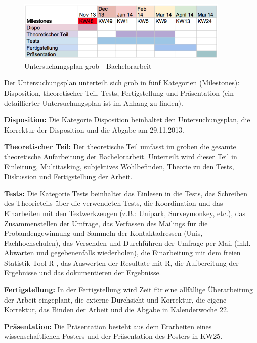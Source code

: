 \begin{figure}[H]
	\centering
	    \includegraphics[width=0.9\textwidth]
		{images/Untersuchungsplan_Grob.png}
	\caption{Untersuchungsplan grob - Bachelorarbeit}
	\label{fig.UntersuchungsplanGrob}
\end{figure}
Der Untersuchungsplan unterteilt sich grob in fünf Kategorien (Milestones): Disposition, theoretischer Teil, Tests, Fertigstellung und Präsentation (ein detaillierter Untersuchungsplan ist im Anhang zu finden).\par
\textbf{Disposition:} Die Kategorie Disposition beinhaltet den Untersuchungsplan, die Korrektur der Disposition und die Abgabe am 29.11.2013.\par
\textbf{Theoretischer Teil:} Der theoretische Teil umfasst im groben die gesamte theoretische Aufarbeitung der Bachelorarbeit. Unterteilt wird dieser Teil in Einleitung, Multitasking, subjektives Wohlbefinden, Theorie zu den Tests, Diskussion und Fertigstellung der Arbeit. \par
\textbf{Tests:} Die Kategorie Tests beinhaltet das Einlesen in die Tests, das Schreiben des Theorieteils über die verwendeten Tests, die Koordination und das Einarbeiten mit den Testwerkzeugen (z.B.: Unipark, Surveymonkey, etc.), das Zusammenstellen der Umfrage, das Verfassen des Mailings für die Probandengewinnung und Sammeln der Kontaktadressen (Unis, Fachhochschulen), das Versenden und Durchführen der Umfrage per Mail (inkl. Abwarten und gegebenenfalls wiederholen), die Einarbeitung mit dem freien Statistik-Tool R \cite{Luhmann2013}, das Auswerten der Resultate mit R, die Aufbereitung der Ergebnisse und das dokumentieren der Ergebnisse.\par
\textbf{Fertigstellung:} In der Fertigstellung wird Zeit für eine allfällige Überarbeitung der Arbeit eingeplant, die externe Durchsicht und Korrektur, die eigene Korrektur, das Binden der Arbeit und die Abgabe in Kalenderwoche 22.\par
\textbf{Präsentation:} Die Präsentation besteht aus dem Erarbeiten eines wissenschaftlichen Posters und der Präsentation des Posters in KW25.\par
